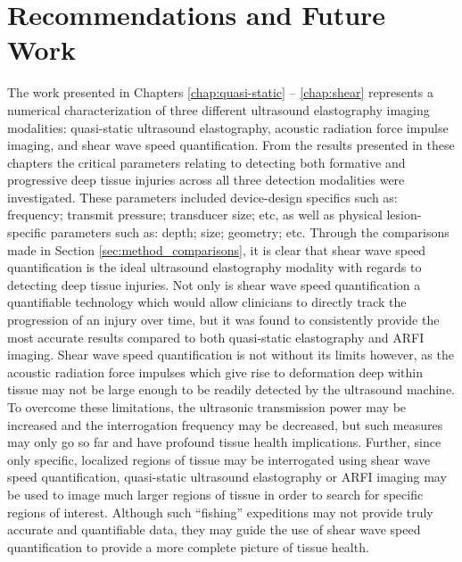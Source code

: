 	\section{Recommendations and Future Work}
		The work presented in Chapters \ref{chap:quasi-static} -- \ref{chap:shear} represents a numerical characterization of three different ultrasound elastography imaging modalities: quasi-static ultrasound elastography, acoustic radiation force impulse imaging, and shear wave speed quantification. From the results presented in these chapters the critical parameters relating to detecting both formative and progressive deep tissue injuries across all three detection modalities were investigated. These parameters included device-design specifics such as: frequency; transmit pressure; transducer size; etc, as well as physical lesion-specific parameters such as: depth; size; geometry; etc. Through the comparisons made in Section \ref{sec:method_comparisons}, it is clear that shear wave speed quantification is the ideal ultrasound elastography modality with regards to detecting deep tissue injuries. Not only is shear wave speed quantification a quantifiable technology which would allow clinicians to directly track the progression of an injury over time, but it was found to consistently provide the most accurate results compared to both quasi-static elastography and ARFI imaging. Shear wave speed quantification is not without its limits however, as the acoustic radiation force impulses which give rise to deformation deep within tissue may not be large enough to be readily detected by the ultrasound machine. To overcome these limitations, the ultrasonic transmission power may be increased and the interrogation frequency may be decreased, but such measures may only go so far and have profound tissue health implications. Further, since only specific, localized regions of tissue may be interrogated using shear wave speed quantification, quasi-static ultrasound elastography or ARFI imaging may be used to image much larger regions of tissue in order to search for specific regions of interest. Although such ``fishing'' expeditions may not provide truly accurate and quantifiable data, they may guide the use of shear wave speed quantification to provide a more complete picture of tissue health.

